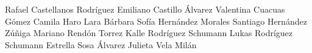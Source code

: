 Rafael Castellanos Rodríguez
Emiliano Castillo Álvarez
Valentina Cuacuas Gómez
Camila Haro Lara
Bárbara Sofía Hernández Morales
Santiago Hernández Zúñiga
Mariano Rendón Torrez
Kalle Rodríguez Schumann
Lukas Rodríguez Schumann
Estrella Sosa Álvarez
Julieta Vela Milán
